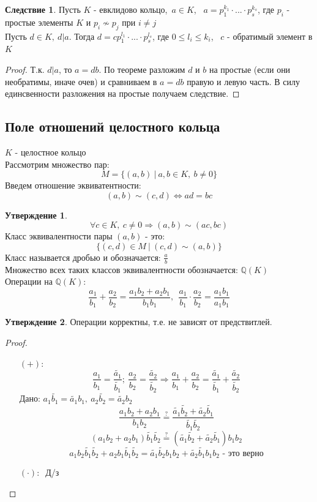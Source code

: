 \documentclass[a4paper, 12pt]{article}
\newcommand{\Q}{\mathbb Q}
\newcommand\tab[1][.5cm]{\hspace*{#1}}
\newcounter{concount}
\theoremstyle{definition}
\newtheorem{consequensenum}[concount]{Следствие}
\newtheorem*{subtheorem}{Утверждение}
\begin{document}
  \begin{consequensenum}
    Пусть $K$ - евклидово кольцо,\ $a\in K$, \ $a=p_1^{k_1}\cdot ...\cdot p_s^{k_s}$, где $p_i$ - простые элементы $K$ и $p_i \not \sim p_j$ при $i \neq j$\\
    Пусть $d\in K, \ d|a$. Тогда $d = c p_1^{l_1}\cdot ... \cdot p_s^{l_s}$, где $0\leq l_i\leq k_i$, \ $c$ - обратимый элемент в $K$             
  \end{consequensenum}
  \begin{proof}
    Т.к. $d|a$, то $a = db$. По теореме разложим $d$ и $b$ на простые (если они необратимы, иначе очев) и сравниваем в $a = db$ правую и левую часть. В силу единсвенности разложения на простые получаем следствие.     
  \end{proof}
  \subsection{Поле отношений целостного кольца}
  $K$ - целостное кольцо\\
  Рассмотрим множество пар: 
  $$M = \{(a, b) \ | \ a, b \in K, \ b\neq 0\}$$
  Введем отношение эквиватентности:
  $$(a, b)\sim (c, d) \Longleftrightarrow ad = bc$$
  \begin{subtheorem}
    $$\forall c \in K, \ c\neq 0 \Longrightarrow (a, b) \sim (ac, bc)$$
    Класс эквивалентности пары $(a, b)$ - это: 
    $$\{(c, d) \in M \ | \ (c, d) \sim (a, b)\}$$
    Класс называется дробью и обозначается: $\frac{a}{b}$ \\
    Множество всех таких классов эквивалентности обозначается: $\Q (K)$ \\
    Операции на $\Q (K)$: 
    $$\frac{a_1}{b_1} + \frac{a_2}{b_2} = \frac{a_1b_2 + a_2b_1}{b_1b_1}, \ \ \frac{a_1}{b_1} \cdot \frac{a_2}{b_2} = \frac{a_1b_1}{a_1b_1}$$ 
  \end{subtheorem}
  \begin{subtheorem}
    Операции корректны, т.е. не зависят от предствитлей.
  \end{subtheorem}
  \begin{proof}\tab
    \begin{itemize} 
      \item[$(+): \ $] 
      $$\frac{a_1}{b_1} = \frac{\widetilde{a_1}}{\widetilde{b_1}}; \ \frac{a_2}{b_2} = \frac{\widetilde{a_2}}{\widetilde{b_2}} \Longrightarrow \frac{a_1}{b_1} + \frac{a_2}{b_2} = \frac{\widetilde{a_1}}{\widetilde{b_1}} + \frac{\widetilde{a_2}}{\widetilde{b_2}}$$
      Дано: $a_1 \widetilde{b_1} = \widetilde{a_1}b_1, \ a_2 \widetilde{b_2} = \widetilde{a_2}b_2$
      $$\frac{a_1b_2 + a_2b_1}{b_1b_2} \overset{?}{=}  \frac{\widetilde{a_1} \widetilde{b_2} + \widetilde{a_2} \widetilde{b_1}}{\widetilde{b_1} \widetilde{b_2}}$$
      $$(a_1b_2 + a_2b_1) \widetilde{b_1} \widetilde{b_2} \overset{?}{=} (\widetilde{a_1} \widetilde{b_2} + \widetilde{a_2} \widetilde{b_1})b_1b_2$$
      $$a_1b_2 \widetilde{b_1} \widetilde{b_2}+ a_2b_1 \widetilde{b_1} \widetilde{b_2} = \widetilde{a_1} \widetilde{b_2} b_1b_2 + \widetilde{a_2} \widetilde{b_1} b_1b_2 \text{ - это верно}$$
      \item[ $(\cdot): \ $ ] Д/з
    \end{itemize}
  \end{proof} 
\end{document}
